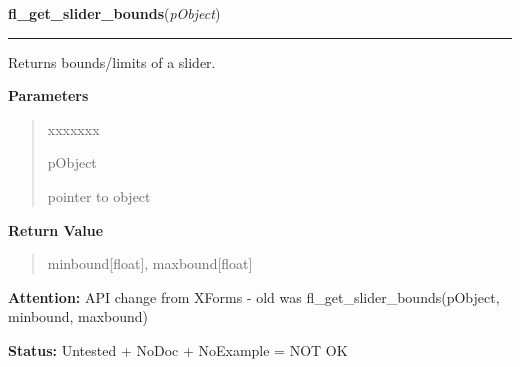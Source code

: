 \hspace{.8\funcindent}\begin{boxedminipage}{\funcwidth}

    \raggedright \textbf{fl\_get\_slider\_bounds}(\textit{pObject})

    \vspace{-1.5ex}

    \rule{\textwidth}{0.5\fboxrule}
\setlength{\parskip}{2ex}
    Returns bounds/limits of a slider.

\setlength{\parskip}{1ex}
      \textbf{Parameters}
      \vspace{-1ex}

      \begin{quote}
        \begin{Ventry}{xxxxxxx}

          \item[pObject]

          pointer to object

        \end{Ventry}

      \end{quote}

      \textbf{Return Value}
    \vspace{-1ex}

      \begin{quote}
      minbound[float], maxbound[float]

      \end{quote}

\textbf{Attention:} API change from XForms - old was fl\_get\_slider\_bounds(pObject, minbound,
maxbound)



\textbf{Status:} Untested + NoDoc + NoExample = NOT OK



    \end{boxedminipage}

    \label{xformslib:library:fl_set_slider_return}

    \vspace{0.5ex}

